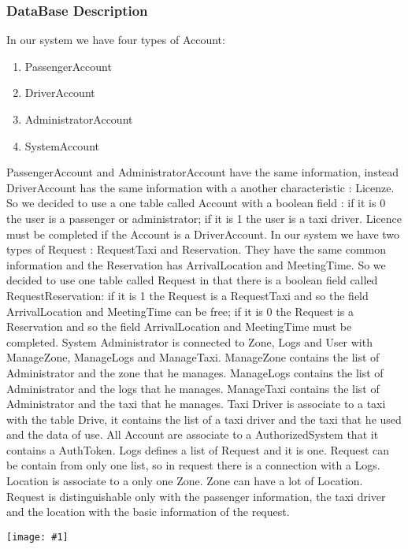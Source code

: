 \documentclass[11pt, a4paper,titlepage]{article}
\newcommand{\image}[1]{
	\begin{center}
		\noindent \texttt{[image: \#1]}
	\end{center}
	}
\begin{document}
\subsubsection{DataBase Description}
In our system we have four types of Account:
\begin{enumerate}
	\item {PassengerAccount}
	\item { DriverAccount}
	\item {AdministratorAccount}
	\item {SystemAccount}
\end{enumerate}	
PassengerAccount and AdministratorAccount have the same information, instead DriverAccount has the same information with a another characteristic : Licenze.
So we decided to use a one table called Account with a boolean field :
if it is 0 the user is a passenger or administrator; if it is 1 the user is a taxi driver.
Licence must be completed if the Account is a DriverAccount.
In our system we have two types of Request :
RequestTaxi and Reservation.
They have the same common information and the Reservation has ArrivalLocation and MeetingTime.
So we decided to use one table called Request in that there is a boolean field called RequestReservation:
if it is 1 the Request is a RequestTaxi and so the field ArrivalLocation and MeetingTime can be free;
if it is 0 the Request is a Reservation and so the field ArrivalLocation and MeetingTime must be completed.
System Administrator is connected to Zone, Logs and User with ManageZone, ManageLogs and ManageTaxi.
ManageZone contains the list of Administrator and the zone that he manages.
ManageLogs contains the list of Administrator and the logs that he manages.
ManageTaxi contains the list of Administrator and the taxi that he manages.
Taxi Driver is associate to a taxi with the table Drive, it contains the list of a taxi driver and the taxi that he used and the data of use.
All Account are associate to a AuthorizedSystem that it contains a AuthToken.
Logs defines a list of Request and it is one.
Request can be contain from only one list, so in request there is a connection with a Logs.
Location is associate to a only one Zone.
Zone can have a lot of Location.
Request is distinguishable only with the passenger information, the taxi driver and  the location with the basic information of the request.
\image{schema_er_database.png}
\end{document}
